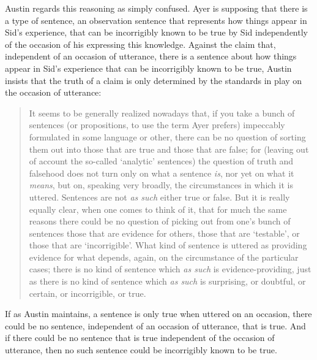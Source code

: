 Austin regards this reasoning as simply confused. Ayer is supposing that there is a type of sentence, an observation sentence that represents how things appear in Sid's experience, that can be incorrigibly known to be true by Sid independently of the occasion of his expressing this knowledge.  Against the claim that, independent of an occasion of utterance, there is a sentence about how things appear in Sid's experience that can be incorrigibly known to be true, Austin insists that the truth of a claim is only determined by the standards in play on the occasion of utterance: 
\begin{quote}
    It seems to be generally realized nowadays that, if you take a bunch of sentences (or propositions, to use the term Ayer prefers) impeccably formulated in some language or other, there can be no question of sorting them out into those that are true and those that are false; for (leaving out of account the so-called `analytic’ sentences) the question of truth and falsehood does not turn only on what a sentence \emph{is}, nor yet on what it \emph{means}, but on, speaking very broadly, the circumstances in which it is uttered. Sentences are not \emph{as such} either true or false. But it is really equally clear, when one comes to think of it, that for much the same reasons there could be no question of picking out from one’s bunch of sentences those that are evidence for others, those that are `testable’, or those that are `incorrigible’. What kind of sentence is uttered as providing evidence for what depends, again, on the circumstance of the particular cases; there is no kind of sentence which \emph{as such} is evidence-providing, just as there is no kind of sentence which \emph{as such} is surprising, or doubtful, or certain, or incorrigible, or true. \citep[111]{Austin:1962lr}
\end{quote}
If as Austin maintains, a sentence is only true when uttered on an occasion, there could be no sentence, independent of an occasion of utterance, that is true. And if there could be no sentence that is true independent of the occasion of utterance, then no such sentence could be incorrigibly known to be true.

